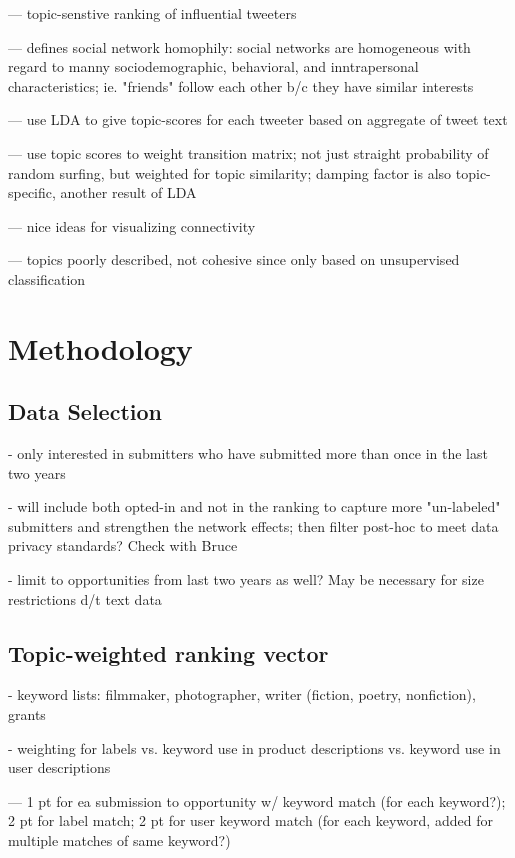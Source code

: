 \documentclass[]{report}   %
\begin{document}
--- topic-senstive ranking of influential tweeters

--- defines social network homophily: social networks are homogeneous with regard to manny sociodemographic, behavioral, and inntrapersonal characteristics; ie. "friends" follow each other b/c they have similar interests

--- use LDA to give topic-scores for each tweeter based on aggregate of tweet text

--- use topic scores to weight transition matrix; not just straight probability of random surfing, but weighted for topic similarity; damping factor is also topic-specific, another result of LDA

--- nice ideas for visualizing connectivity

--- topics poorly described, not cohesive since only based on unsupervised classification


\chapter{Methodology}

\section{Data Selection}

- only interested in submitters who have submitted more than once in the last two years

- will include both opted-in and not in the ranking to capture more "un-labeled" submitters and strengthen the network effects; then filter post-hoc to meet data privacy standards? Check with Bruce

- limit to opportunities from last two years as well? May be necessary for size restrictions d/t text data

\section{Topic-weighted ranking vector}

- keyword lists: filmmaker, photographer, writer (fiction, poetry, nonfiction), grants

- weighting for labels vs. keyword use in product descriptions vs. keyword use in user descriptions

--- 1 pt for ea submission to opportunity w/ keyword match (for each keyword?); 2 pt for label match; 2 pt for user keyword match (for each keyword, added for multiple matches of same keyword?)
\end{document}
